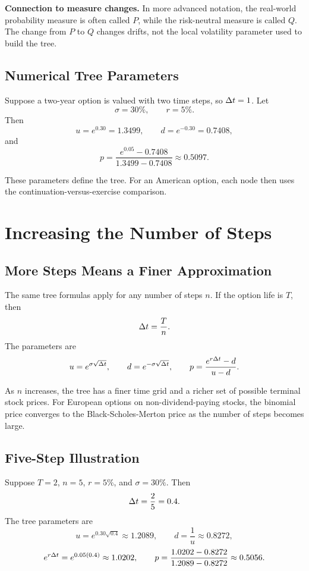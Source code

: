 \begin{boxD}
\textbf{Connection to measure changes.} In more advanced notation, the
real-world probability measure is often called $P$, while the risk-neutral
measure is called $Q$. The change from $P$ to $Q$ changes drifts, not the local
volatility parameter used to build the tree.
\end{boxD}

\subsection{Numerical Tree Parameters}

Suppose a two-year option is valued with two time steps, so $\Delta t=1$. Let
\[
    \sigma=30\%,
    \qquad
    r=5\%.
\]
Then
\[
    u=e^{0.30}=1.3499,
    \qquad
    d=e^{-0.30}=0.7408,
\]
and
\[
    p=
    \frac{e^{0.05}-0.7408}{1.3499-0.7408}
    \approx
    0.5097.
\]

These parameters define the tree. For an American option, each node then uses
the continuation-versus-exercise comparison.

\section{Increasing the Number of Steps}

\subsection{More Steps Means a Finer Approximation}

The same tree formulas apply for any number of steps $n$. If the option life is
$T$, then
\[
    \Delta t=\frac{T}{n}.
\]
The parameters are
\[
    u=e^{\sigma\sqrt{\Delta t}},
    \qquad
    d=e^{-\sigma\sqrt{\Delta t}},
    \qquad
    p=\frac{e^{r\Delta t}-d}{u-d}.
\]

As $n$ increases, the tree has a finer time grid and a richer set of possible
terminal stock prices. For European options on non-dividend-paying stocks, the
binomial price converges to the Black-Scholes-Merton price as the number of
steps becomes large.

\subsection{Five-Step Illustration}

Suppose $T=2$, $n=5$, $r=5\%$, and $\sigma=30\%$. Then
\[
    \Delta t=\frac{2}{5}=0.4.
\]
The tree parameters are
\[
    u=e^{0.30\sqrt{0.4}}\approx 1.2089,
    \qquad
    d=\frac{1}{u}\approx 0.8272,
\]
\[
    e^{r\Delta t}=e^{0.05(0.4)}\approx 1.0202,
    \qquad
    p=\frac{1.0202-0.8272}{1.2089-0.8272}\approx 0.5056.
\]


